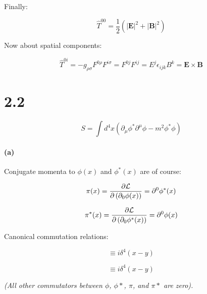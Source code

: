 \documentclass[11pt]{article}
\begin{document}
Finally:

\begin{equation}
\hat{T}^{00} =
  \frac{1}{2} \left( |\mathbf{E}|^2 + |\mathbf{B}|^2 \right)
\end{equation}

Now about spatial components:

\begin{equation}
\hat{T}^{0i} = -g_{\rho \sigma} F^{0 \rho} F^{i \sigma} =
  F^{0 j} F^{i j} = E^j \epsilon_{ijk} B^k =
  \mathbf{E} \times \mathbf{B}
\end{equation}

\pagebreak

\section*{2.2}

\begin{equation}
S = \int d^4 x \left(
  \partial_\mu \phi^* \partial^\mu \phi - m^2 \phi^* \phi \right)
\end{equation}

\paragraph*{(a)}

Conjugate momenta to $\phi(x)$ and $\phi^*(x)$ are of course:

\begin{equation}
\pi(x) =
  \frac{\partial {\cal{L}}}
    {\partial \left( \partial_0{\phi(x)} \right)} =
  \partial^0 \phi^*(x)
\end{equation}

\begin{equation}
\pi^*(x) =
  \frac{\partial {\cal{L}}}
    {\partial \left( \partial_0{\phi^*(x)} \right)} =
  \partial^0 \phi(x)
\end{equation}

Canonical commutation relations:

\begin{equation}
[ \phi(x), \pi(y) ] \equiv i \delta^4 (x - y)
\end{equation}

\begin{equation}
[ \phi^*(x), \pi^*(y) ] \equiv i \delta^4 (x - y)
\end{equation}

\textit{
(All other commutators between $\phi$, $\phi*$, $\pi$, and $\pi*$ are
zero).
}
\end{document}
